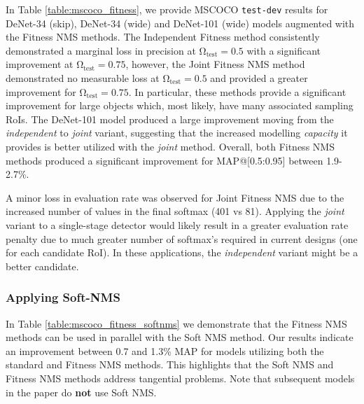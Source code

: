 \documentclass[10pt,twocolumn,letterpaper]{article}
\begin{document}
In Table \ref{table:mscoco_fitness}, we provide MSCOCO \texttt{test-dev} results for DeNet-34 (skip), DeNet-34 (wide) and DeNet-101 (wide) models augmented with the Fitness NMS methods. The Independent Fitness method consistently demonstrated a marginal loss in precision at $\bm{\mathrm{\Omega_{test}}}=0.5$ with a significant improvement at $\bm{\mathrm{\Omega_{test}}}=0.75$, however, the Joint Fitness NMS method demonstrated no measurable loss at $\bm{\mathrm{\Omega_{test}}}=0.5$ and provided a greater improvement for $\bm{\mathrm{\Omega_{test}}}=0.75$. In particular, these methods provide a significant improvement for large objects which, most likely, have many associated sampling RoIs. The DeNet-101 model produced a large improvement moving from the \textit{independent} to \textit{joint} variant, suggesting that the increased modelling \textit{capacity} it provides is better utilized with the \textit{joint} method. Overall, both Fitness NMS methods produced a significant improvement for MAP@[0.5:0.95] between 1.9-2.7\%. 

\newpage

A minor loss in evaluation rate was observed for Joint Fitness NMS due to the increased number of values in the final softmax (401 vs 81). Applying the \textit{joint} variant to a single-stage detector\cite{ssd}\cite{retinanet} would likely result in a greater evaluation rate penalty due to much greater number of softmax's required in current designs (one for each candidate RoI). In these applications, the \textit{independent} variant might be a better candidate.
\subsubsection{Applying Soft-NMS}
In Table \ref{table:mscoco_fitness_softnms} we demonstrate that the Fitness NMS methods can be used in parallel with the Soft NMS method\cite{soft-nms}. Our results indicate an improvement between 0.7 and 1.3\% MAP for models utilizing both the standard and Fitness NMS methods. This highlights that the Soft NMS and Fitness NMS methods address tangential problems. Note that subsequent models in the paper do \textbf{not} use Soft NMS.
\end{document}
